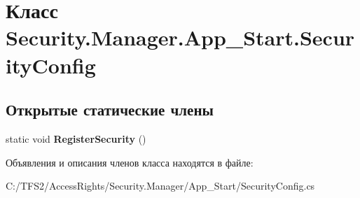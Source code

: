 \hypertarget{class_security_1_1_manager_1_1_app___start_1_1_security_config}{}\section{Класс Security.\+Manager.\+App\+\_\+\+Start.\+Security\+Config}
\label{class_security_1_1_manager_1_1_app___start_1_1_security_config}
\subsection*{Открытые статические члены}
\begin{DoxyCompactItemize}
\item 
\mbox{\label{class_security_1_1_manager_1_1_app___start_1_1_security_config_a1bcf73eabd5bd8ce330ac979bf487b4e}} 
static void {\bfseries Register\+Security} ()
\end{DoxyCompactItemize}


Объявления и описания членов класса находятся в файле\+:\begin{DoxyCompactItemize}
\item 
C\+:/\+T\+F\+S2/\+Access\+Rights/\+Security.\+Manager/\+App\+\_\+\+Start/Security\+Config.\+cs\end{DoxyCompactItemize}
